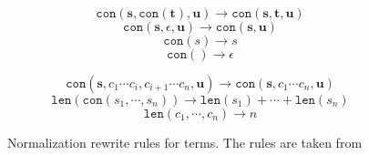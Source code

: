 \begin{figure}[htb]
\begin{minipage}{.45\linewidth}
\[
 \texttt{con}(\mathbf{s},  \texttt{con}(\mathbf{t}), \mathbf{u}) \rightarrow   \texttt{con}(\mathbf{s}, \mathbf{t}, \mathbf{u})
\]
\[
\texttt{con}(\mathbf{s}, \epsilon, \mathbf{u}) \rightarrow \texttt{con}(\mathbf{s}, \mathbf{u})
\]
\[
 \texttt{con}(s) \rightarrow s
\]
\[
 \texttt{con}() \rightarrow \epsilon
\]
\end{minipage}%
\begin{minipage}{.45\linewidth}
\[
 \texttt{con}(\mathbf{s}, c_1 \cdots c_i, c_{i+1} \cdots c_n, \mathbf{u}) \rightarrow \texttt{con}(\mathbf{s}, c_1 \cdots c_n, \mathbf{u})
\]
\[
 \texttt{len}( \texttt{con}(s_1,\cdots,s_n)) \rightarrow \texttt{len}(s_1) + \cdots + \texttt{len}(s_n)
\]
\[
  \texttt{len}(c_1,\cdots,c_n) \rightarrow n
\]
\end{minipage}
\caption{Normalization rewrite rules for terms. The rules are taken from \cite{main-paper}}
\label{fig:normalization_rewrite_rules}
\end{figure}